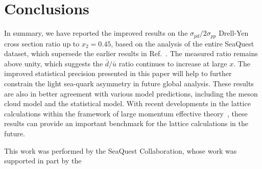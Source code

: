 \documentclass[reprint,aps,unsortedaddress,superscriptaddress,prl,floatfix,showpacs,linenumbers,final]{revtex4-2}
\begin{document}
\section{Conclusions}
\label{sec:Conclusions}
In summary, we have reported the improved results on the $\sigma_{pd}/2\sigma_{pp}$ Drell-Yen cross section ratio up to $x_2=0.45$,
based on the analysis of the entire SeaQuest dataset, which supersede the earlier results in Ref.~\cite{dove2021,dove2023}.
The measured ratio remains above unity, which suggests the $\bar{d}/\bar{u}$ ratio continues to increase at large $x$.
The improved statistical precision presented in this paper will help to further constrain the light sea-quark asymmetry in future global analysis.
These results are also in better agreement with various model predictions, including the meson cloud model and the statistical model.
With recent developments in the lattice calculations within the framework of large momentum effective theory~\cite{constantinou2021},
these results can provide an important benchmark for the lattice calculations in the future.
\begin{acknowledgments}
	This work was performed by the SeaQuest Collaboration, whose work was supported in part by the
\end{acknowledgments}

\end{document}
